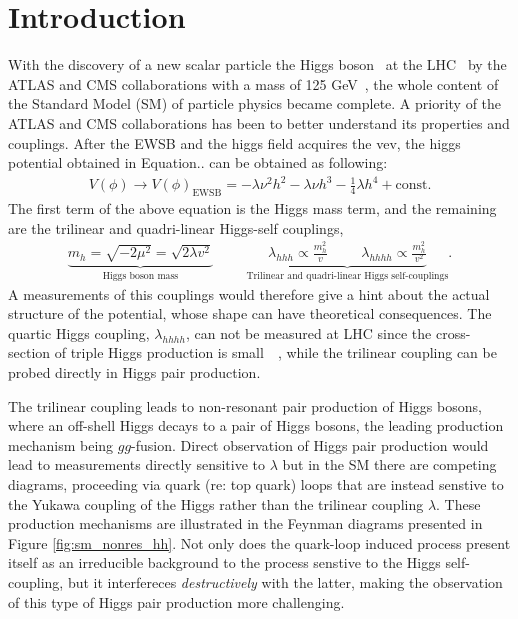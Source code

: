 \section{Introduction}
\label{sec:intro}

With the discovery of a new scalar particle the Higgs boson~\cite{HIGG-2012-27,CMS-HIG-12-028} at the LHC~\cite{Evans:2008zzb} by the ATLAS and CMS collaborations with a mass of 125 GeV~\cite{HIGG-2016-33,HIGG-2013-12,HIGG-2014-14,CMS-HIG-14-009}, the whole content of the Standard Model (SM) of particle physics became complete. A priority of the ATLAS and CMS collaborations has been to better understand its properties and couplings.
After the EWSB and the higgs field acquires the vev, the higgs potential obtained in Equation.. can be obtained as following:
\begin{align}
	V(\phi) \rightarrow V(\phi)_{\text{EWSB}} =  -\lambda \nu^2 h^2 - \lambda \nu h^3 - \frac{1}{4} \lambda h^4 + \text{const.}
	\label{eq:higgs_pot}
\end{align}
The first term of the above equation is the Higgs mass term, and the remaining are the trilinear and quadri-linear Higgs-self couplings,
\begin{align}
	\underbrace{m_{h} = \sqrt{ - 2 \mu^2} = \sqrt{ 2 \lambda v^2 }}_\text{Higgs boson mass} \hspace{1cm} \underbrace{\lambda_{hhh} \propto \frac{m_h^2}{v} \hspace{1cm} \lambda_{hhhh} \propto \frac{m_h^2}{v^2}}_\text{Trilinear and quadri-linear Higgs self-couplings}.
	\label{eq:higgs_self_couplings}
\end{align}
A measurements of this couplings would therefore give a hint about the actual structure of the potential, whose shape can have  theoretical consequences. The quartic Higgs coupling, $\lambda_{hhhh}$, can not be measured at LHC since the cross-section of triple Higgs production is small~\cite{PhysRevD.74.113008}~\cite{PhysRevD.93.035026}, while the trilinear coupling can be probed directly in Higgs pair production. 

The trilinear coupling leads to non-resonant pair production of Higgs bosons, where an off-shell
Higgs decays to a pair of Higgs bosons, the leading production mechanism being $gg$-fusion.
Direct observation of Higgs pair production would lead to measurements directly sensitive to
$\lambda$ but in the SM there are competing diagrams, proceeding via quark (re: top quark) loops
that are instead senstive to the Yukawa coupling of the Higgs rather than the trilinear coupling
$\lambda$. These \dihiggs production mechanisms are illustrated in the Feynman diagrams presented
in Figure \ref{fig:sm_nonres_hh}. Not only does the quark-loop induced process present
itself as an irreducible background to the process senstive to the Higgs self-coupling, but
it interfereces \textit{destructively} with the latter, making the observation of this
type of Higgs pair production more challenging.


